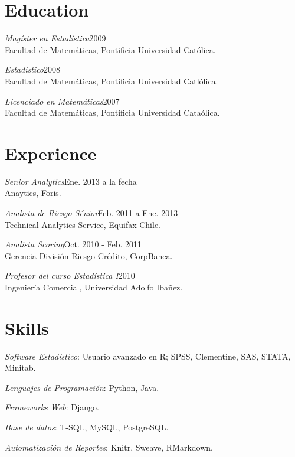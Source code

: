 \documentclass[margin]{res}
\begin{document}
\begin{resume}

\section{Education}
    {\sl Magíster en Estadística}\hfill 2009\\
    Facultad de Matemáticas, Pontificia Universidad Católica.

    {\sl Estadístico}\hfill 2008\\
    Facultad de Matemáticas, Pontificia Universidad Catlólica.

    {\sl Licenciado en Matemáticas}\hfill 2007\\
    Facultad de Matemáticas, Pontificia Universidad Cataólica.

\vspace{1cm}

\section{Experience}

    {\sl Senior Analytics}\hfill Ene. 2013 a la fecha\\
    Anaytics, Foris.

    {\sl Analista de Riesgo Sénior}\hfill Feb. 2011 a Ene. 2013\\
    Technical Analytics Service, Equifax Chile.

    {\sl Analista Scoring}\hfill Oct. 2010 - Feb. 2011\\
    Gerencia División Riesgo Crédito, CorpBanca.

    {\sl Profesor del curso Estadística I}\hfill 2010\\
    Ingeniería Comercial, Universidad Adolfo Ibañez.

\vspace{1cm}

\section{Skills}
    {\sl Software Estadístico}: Usuario avanzado en R; SPSS, Clementine, SAS, STATA, Minitab.

    {\sl Lenguajes de Programación}: Python, Java.
    
    {\sl Frameworks Web}: Django.

    {\sl Base de datos}: T-SQL, MySQL, PostgreSQL.

    {\sl Automatización de Reportes}: Knitr, Sweave, RMarkdown.


\end{resume}
\end{document}
